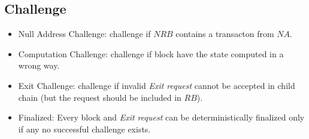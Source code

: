 \documentclass[letterpaper, 11pt]{article}
\begin{document}
\subsection{Challenge}
\begin{CJK}{UTF8}{mj}
\begin{itemize}
    \item Null Address Challenge: challenge if $NRB$ contains a transacton from $NA$.
    \item Computation Challenge: challenge if block have the state computed in a wrong way.
    \item Exit Challenge: challenge if invalid \emph{Exit request} cannot be accepted in child chain (but the request should be included in $RB$).
    \item Finalized: Every block and \emph{Exit request} can be deterministically finalized only if any no successful challenge exists.
\end{itemize}
\end{CJK}
\end{document}
